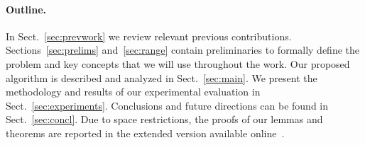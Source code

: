 \paragraph*{Outline.}
In Sect.~\ref{sec:prevwork} we review relevant previous contributions.
Sections~\ref{sec:prelims} and~\ref{sec:range} contain preliminaries to formally define the problem
and key concepts that we will use throughout the work. Our proposed algorithm is
described and analyzed in Sect.~\ref{sec:main}. We present the methodology and
results of our experimental evaluation in Sect.~\ref{sec:experiments}.
Conclusions and future directions can be found in Sect.~\ref{sec:concl}.
\ifarxiv
\else
Due to space restrictions, the proofs of our lemmas
and theorems are reported in the extended version available
online~\citep{RiondatoV14-full}.
\fi

%
%
%
